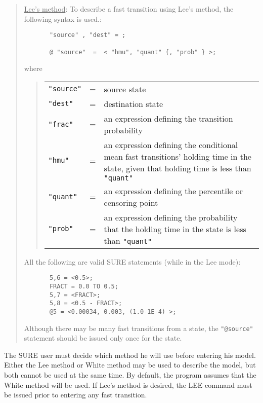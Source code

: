 \begin{quote}
\underline{Lee's method}:  To describe a fast transition using 
Lee's method, the following syntax is used.:

\begin{verbatim}
       "source" , "dest" = ;

       @ "source"  =  < "hmu", "quant" {, "prob" } >;
\end{verbatim}

where
\begin{quote}
\begin{tabular}{llp{5.0in}}
        \verb|"source"| & = & source state \\

        \verb|"dest"|  & = & destination state \\

        \verb|"frac"|  & = & an expression defining the transition probability \\

        \verb|"hmu"| & = & an expression defining the conditional mean fast transitions'
        holding time in the state, given that holding time is less than
        \verb|"quant"| \\

        \verb|"quant"| & = & an expression defining the percentile or
        censoring point \\

        \verb|"prob"| & = & an expression defining the probability that the
        holding time in the state is less than \verb|"quant"| \\
\end{tabular}
\end{quote}

All the following are valid SURE statements (while in the Lee mode):
\begin{verbatim}
       5,6 = <0.5>;
       FRACT = 0.0 TO 0.5;
       5,7 = <FRACT>;
       5,8 = <0.5 - FRACT>;
       @5 = <0.00034, 0.003, (1.0-1E-4) >;
\end{verbatim}
Although there may be many fast transitions from a state, the \verb|"@source"|
statement should be issued only once for the state.
\end{quote}


The SURE user must decide which method he will use before entering his model.
Either the Lee method or White method may be used to describe the model, but
both cannot be used at the same time.  By default, the program assumes that
the White method will be used.  If Lee's method is desired, the {\isf LEE}
command must be issued prior to entering any fast transition.

